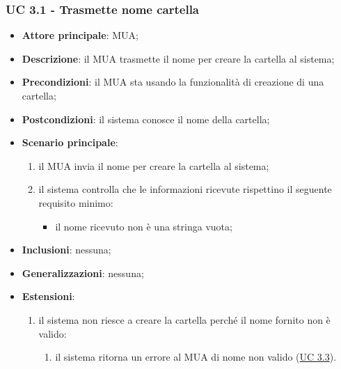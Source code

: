 \subsubsection{UC 3.1 - Trasmette nome cartella} \label{sec:UC3.1}
    \begin{itemize}
        \item \textbf{Attore principale}: MUA;
        \item \textbf{Descrizione}: il MUA trasmette il nome per creare la cartella al sistema;
        \item \textbf{Precondizioni}: il MUA sta usando la funzionalità di creazione di una cartella;
        \item \textbf{Postcondizioni}: il sistema conosce il nome della cartella;
        \item \textbf{Scenario principale}:
            \begin{enumerate}
                \item il MUA invia il nome per creare la cartella al sistema;
                \item il sistema controlla che le informazioni ricevute rispettino il seguente requisito minimo:
                \begin{itemize}
                    \item il nome ricevuto non è una stringa vuota;
                \end{itemize}
            \end{enumerate}
        \item \textbf{Inclusioni}: nessuna;
        \item \textbf{Generalizzazioni}: nessuna;
        \item \textbf{Estensioni}:
            \begin{enumerate}[label=\alph*.]
                \item il sistema non riesce a creare la cartella perché il nome fornito non è valido:
                \begin{enumerate}[label=\arabic*.]
                    \item il sistema ritorna un errore al MUA di nome non valido (\hyperref[sec:UC3.3]{UC 3.3}).
                \end{enumerate}
            \end{enumerate}
    \end{itemize}

